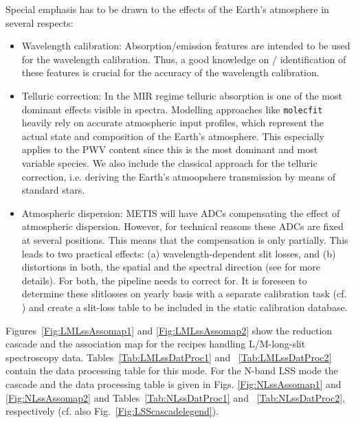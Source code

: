 Special emphasis has to be drawn to the effects of the Earth's
atmosphere in several respects:
\begin{itemize}
\item Wavelength calibration: Absorption/emission features are intended to be
  used for the wavelength calibration. Thus, a good knowledge on /
  identification of these features is crucial for the accuracy of the
  wavelength calibration.
\item Telluric correction: In the MIR regime telluric absorption is
  one of the most dominant effects visible in spectra. Modelling
  approaches like \texttt{molecfit} heavily rely on accurate
  atmospheric input profiles, which represent the actual state and
  composition of the Earth's atmosphere. This especially applies to
  the \ac{PWV} content since this is the most dominant and most variable species. We also include the classical approach for the telluric correction, i.e. deriving the Earth's atmoopshere transmission by means of standard stars.
\item Atmospheric dispersion: \ac{METIS} will have \ac{ADC}s compensating the
  effect of atmospheric dispersion. However, for technical reasons
  these ADCs are fixed at several positions. This means that the
  compensation is only partially. This leads to two practical effects:
  (a) wavelength-dependent slit losses, and (b) distortions in both,
  the spatial and the spectral direction (see \cite{METIS-ADC_study}
  for more details). For both, the pipeline needs to correct
  for. It is foreseen to determine these slitlosses on yearly basis with a separate calibration task (cf. \cite{METIS-calibration_plan}) and create a slit-loss table to be included in the static calibration database.
\end{itemize}


Figures~\ref{Fig:LMLssAssomap1} and \ref{Fig:LMLssAssomap2} show the reduction cascade and the association map for the recipes handling L/M-long-slit
spectroscopy data.  Tables~\ref{Tab:LMLssDatProc1} and ~\ref{Tab:LMLssDatProc2} contain the data processing table for this mode. For the N-band \ac{LSS} mode the cascade and the data processing table is given in Figs. \ref{Fig:NLssAssomap1} and \ref{Fig:NLssAssomap2} and Tables~\ref{Tab:NLssDatProc1} and ~\ref{Tab:NLssDatProc2}, respectively (cf. also Fig.~\ref{Fig:LSScascadelegend}).


